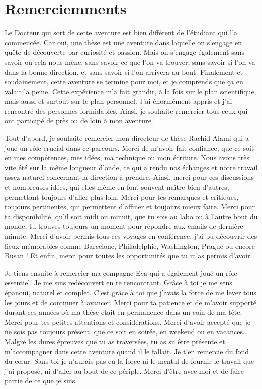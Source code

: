 \chapter*{Remerciemments}
 

Le Docteur qui sort de cette aventure est bien différent de l'étudiant qui l'a commencée. Car oui, une thèse est une aventure dans laquelle on s'engage en quête de découverte par curiosité et passion.
Mais on s'engage également sans savoir où cela nous mène, sans savoir ce que l'on va trouver, sans savoir si l'on va dans la bonne direction, et sans savoir si l'on arrivera au bout.
Finalement et soudainement, cette aventure se termine pour moi, et je comprends que ça en valait la peine. 
Cette expérience m'a fait grandir, à la fois sur le plan scientifique, mais aussi et surtout sur le plan personnel.
J'ai énormément appris et j'ai rencontré des personnes formidables.
Ainsi, je souhaite remercier tous ceux qui ont participé de près ou de loin à mon aventure.



Tout d'abord, je souhaite remercier mon directeur de thèse Rachid Alami qui a joué un rôle crucial dans ce parcours.
Merci de m'avoir fait confiance, que ce soit en mes compétences, mes idées, ma technique ou mon écriture.
Nous avons très vite été sur la même longueur d'onde, ce qui a rendu nos échanges et notre travail assez naturel concernant la direction à prendre.
Ainsi, merci pour ces discussions et nombreuses idées, qui elles même en font souvent naître bien d'autres, permettant toujours d'aller plus loin. 
Merci pour tes remarques et critiques, toujours pertinentes, qui permettent d'affiner et toujours mieux faire.
Merci pour ta disponibilité, qu'il soit midi ou minuit, que tu sois au labo ou à l'autre bout du monde, tu trouves toujours un moment pour répondre aux emails de dernière minute.
Merci d'avoir permis tous ces voyages en conférence, j'ai pu découvrir des lieux mémorables comme Barcelone, Philadelphie, Washington, Prague ou encore Busan ! 
Et enfin, merci pour toutes les opportunités que tu m'as permis d'avoir.



Je tiens ensuite à remercier ma compagne Eva qui a également joué un rôle essentiel. 
Je me suis redécouvert en te rencontrant. Grâce à toi je me sens épanoui, naturel et complet. C'est grâce à toi que j'avais la force de me lever tous les jours et de continuer à avancer. 
Merci pour ta patience et de m'avoir supporté durant ces années où ma thèse était en permanence dans un coin de ma tête.  
Merci pour tes petites attentions et considérations. 
Merci d'avoir accepté que je ne sois pas toujours présent, que ce soit en soirée, en weekend ou en vacances. 
Malgré les dures épreuves que tu as traversées, tu as su être présente et m'accompagner dans cette aventure quand il le fallait.
Je t'en remercie du fond du cœur.
Sans toi je n'aurais pas eu la force ni le mental de fournir le travail que j'ai proposé, ni d'aller au bout de ce périple.
Merci d'être avec moi et de faire partie de ce que je suis. 


